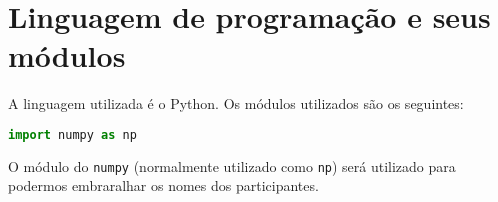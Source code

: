 
\section{Linguagem de programação e seus módulos}

A linguagem utilizada é o Python\cite{Python}.
Os módulos utilizados são os seguintes:

\begin{lstlisting}[language=Python]
import numpy as np
\end{lstlisting}

O módulo do \texttt{numpy} \cite{NumPy} (normalmente utilizado como \texttt{np}) será utilizado para podermos embraralhar os nomes dos participantes.
